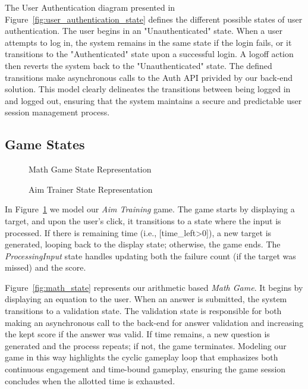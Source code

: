 \documentclass[11pt,a4paper]{article}
\newcommand{\inputdiagram}[1]{}
\newcommand{\textwidthdiagram}[2][1]{%
  \resizebox{#1\textwidth}{!}{\inputdiagram{#2}}%
}
\begin{document}
The User Authentication diagram presented in
Figure~\ref{fig:user_authentication_state} defines the different possible
states of user authentication. The user begins in an "Unauthenticated" state. When a
user attempts to log in, the system remains in the same state if the login
fails, or it transitions to the "Authenticated" state upon a successful
login. A logoff action then reverts the system back to the "Unauthenticated"
state. The defined transitions make asynchronous calls to the Auth API privided
by our back-end solution. This model clearly delineates the transitions
between being logged in and logged out, ensuring that the system maintains
a secure and predictable user session management process.

\subsection{Game States}
\begin{figure}[H]
    \centering
    \begin{minipage}[b]{0.48\textwidth}
        \centering
        \textwidthdiagram{math_state.tex}
        \caption{Math Game State Representation}
        \label{fig:math_state}
    \end{minipage}
    \hfil
    \begin{minipage}[b]{0.48\textwidth}
        \centering
        \textwidthdiagram{aim_trainer_state.tex}
        \caption{Aim Trainer State Representation}
        \label{fig:aim_trainer_state}
    \end{minipage}
\end{figure}

In Figure~\ref{fig:aim_trainer_state} we model our \textit{Aim Training} game. The
game starts by displaying a target, and upon the user's click, it transitions
to a state where the input is processed. If there is remaining time (i.e.,
[time\_left>0]), a new target is generated, looping back to the display state;
otherwise, the game ends. The \textit{ProcessingInput} state handles updating both
the failure count (if the target was missed) and the score.

Figure~\ref{fig:math_state} represents our arithmetic based \textit{Math Game}. It
begins by displaying an equation to the user. When an answer is submitted, the
system transitions to a validation state. The validation state is responsible
for both making an asynchronous call to the back-end for answer validation
and increasing the kept score if the answer was valid. If time remains,
a new question is generated and the process repeats; if not, the game
terminates. Modeling our game in this way highlights the cyclic gameplay
loop that emphasizes both continuous engagement and time-bound gameplay,
ensuring the game session concludes when the allotted time is exhausted.
\end{document}
